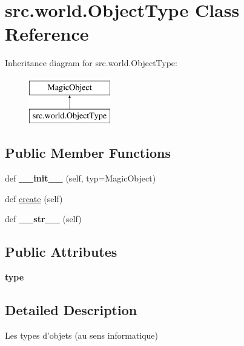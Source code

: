 \hypertarget{classsrc_1_1world_1_1_object_type}{}\section{src.\+world.\+Object\+Type Class Reference}
\label{classsrc_1_1world_1_1_object_type}
Inheritance diagram for src.\+world.\+Object\+Type\+:\begin{figure}[H]
\begin{center}
\leavevmode
\includegraphics[height=2.000000cm]{classsrc_1_1world_1_1_object_type}
\end{center}
\end{figure}
\subsection*{Public Member Functions}
\begin{DoxyCompactItemize}
\item 
\hypertarget{classsrc_1_1world_1_1_object_type_a1ae66033b569493cc22334ce60d4ac35}{}\label{classsrc_1_1world_1_1_object_type_a1ae66033b569493cc22334ce60d4ac35} 
def {\bfseries \+\_\+\+\_\+init\+\_\+\+\_\+} (self, typ=Magic\+Object)
\item 
def \hyperlink{classsrc_1_1world_1_1_object_type_a0b0ce8c43e3df2d9c88110c9a0ef262b}{create} (self)
\item 
\hypertarget{classsrc_1_1world_1_1_object_type_afc6642dca23b0315cbefecfe04be6c60}{}\label{classsrc_1_1world_1_1_object_type_afc6642dca23b0315cbefecfe04be6c60} 
def {\bfseries \+\_\+\+\_\+str\+\_\+\+\_\+} (self)
\end{DoxyCompactItemize}
\subsection*{Public Attributes}
\begin{DoxyCompactItemize}
\item 
\hypertarget{classsrc_1_1world_1_1_object_type_a14def39335a48925d12913a0ff7b8d83}{}\label{classsrc_1_1world_1_1_object_type_a14def39335a48925d12913a0ff7b8d83} 
{\bfseries type}
\end{DoxyCompactItemize}


\subsection{Detailed Description}
\begin{DoxyVerb}Les types d'objets (au sens informatique) \end{DoxyVerb}
 

